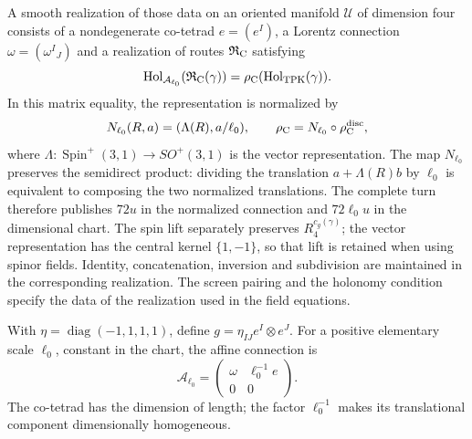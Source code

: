 A smooth realization of those data on an oriented manifold
\(\mathcal U\) of dimension four consists of a nondegenerate
co-tetrad \(e=(e^I)\), a Lorentz connection
\(\omega=(\omega^I{}_J)\) and a realization of routes
\(\mathfrak R_{\rm C}\) satisfying
\begin{equation}
 \operatorname{Hol}_{\mathcal A_{\ell_0}}
       (\mathfrak R_{\rm C}(\gamma))
 =\rho_{\rm C}(\operatorname{Hol}_{\rm TPK}(\gamma)).
 \label{vii:vii:eq:compatibilidad-holonomia-geometrica}
\end{equation}
In this matrix equality, the representation is normalized by
\[
 N_{\ell_0}(R,a)=(\Lambda(R),a/\ell_0),\qquad
 \rho_{\rm C}=N_{\ell_0}\circ\rho_{\rm C}^{\rm disc},
\]
where \(\Lambda:\operatorname{Spin}^+(3,1)\to SO^+(3,1)\)
is the vector representation. The map \(N_{\ell_0}\)
preserves the semidirect product: dividing the translation
\(a+\Lambda(R)b\) by \(\ell_0\) is equivalent to composing the
two normalized translations. The complete turn therefore publishes
\(72u\) in the normalized connection and \(72\ell_0u\) in the
dimensional chart. The spin lift separately preserves
\(R_4^{c_g(\gamma)}\); the vector representation has the
central kernel \(\{1,-1\}\), so that lift is retained
when using spinor fields.
Identity, concatenation, inversion and subdivision are maintained in the
corresponding realization. The screen pairing
and the holonomy condition specify the data of the
realization used in the field equations.

With \(\eta=\operatorname{diag}(-1,1,1,1)\), define
\(g=\eta_{IJ}e^I\otimes e^J\). For a positive elementary scale
\(\ell_0\), constant in the chart, the affine connection is
\begin{equation}
 \mathcal A_{\ell_0}
 =\begin{pmatrix}\omega&\ell_0^{-1}e\\0&0\end{pmatrix}.
 \label{vii:vii:eq:conexion-afin-realizada}
\end{equation}
The co-tetrad has the dimension of length; the factor
\(\ell_0^{-1}\) makes its translational component dimensionally homogeneous.

